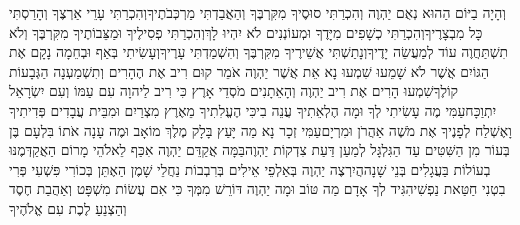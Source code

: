 \documentclass[../main/main.tex]{subfiles}
\begin{document}
\begin{multicols*}{\ncols}
וְהָיָה בַיּוֹם הַהוּא נְאֻם יַהְוֶה וְהִכְרַתִּי סוּסֶיךָ מִקִּרְבֶּךָ וְהַאֲבַדְתִּי מַרְכְּבֹתֶיךָ\PreVerseSpace{}וְהִכְרַתִּי עָרֵי אַרְצֶךָ וְהָרַסְתִּי כָּל מִבְצָרֶיךָ\PreVerseSpace{}וְהִכְרַתִּי כְשָׁפִים מִיָּדֶךָ וּמְעוֹנְנִים לֹא יִהְיוּ לָךְ\PreVerseSpace{}וְהִכְרַתִּי פְסִילֶיךָ וּמַצֵּבוֹתֶיךָ מִקִּרְבֶּךָ וְלֹא תִשְׁתַּחֲוֶה עוֹד לְמַעֲשֵׂה יָדֶיךָ\PreVerseSpace{}וְנָתַשְׁתִּי אֲשֵׁירֶיךָ מִקִּרְבֶּךָ וְהִשְׁמַדְתִּי עָרֶיךָ\PreVerseSpace{}וְעָשִׂיתִי בְּאַף וּבְחֵמָה נָקָם אֶת הַגּוֹיִם אֲשֶׁר לֹא שָׁמֵעוּ \ClosedSection{}שִׁמְעוּ נָא אֵת אֲשֶׁר יַהְוֶה אֹמֵר קוּם רִיב אֶת הֶהָרִים וְתִשְׁמַעְנָה הַגְּבָעוֹת קוֹלֶךָ\PreVerseSpace{}שִׁמְעוּ הָרִים אֶת רִיב יַהְוֶה וְהָאֵתָנִים מֹסְדֵי אָרֶץ כִּי רִיב לַיהוָה עִם עַמּוֹ וְעִם יִשְׂרָאֵל יִתְוַכָּח\PreVerseSpace{}עַמִּי מֶה עָשִׂיתִי לְךָ וּמָה הֶלְאֵתִיךָ עֲנֵה בִי\PreVerseSpace{}כִּי הֶעֱלִתִיךָ מֵאֶרֶץ מִצְרַיִם וּמִבֵּית עֲבָדִים פְּדִיתִיךָ וָאֶשְׁלַח לְפָנֶיךָ אֶת מֹשֶׁה אַהֲרֹן וּמִרְיָם\PreVerseSpace{}עַמִּי זְכָר נָא מַה יָּעַץ בָּלָק מֶלֶךְ מוֹאָב וּמֶה עָנָה אֹתוֹ בִּלְעָם בֶּן בְּעוֹר מִן הַשִּׁטִּים עַד הַגִּלְגָּל לְמַעַן דַּעַת צִדְקוֹת יַהְוֶה\PreVerseSpace{}בַּמָּה אֲקַדֵּם יַהְוֶה אִכַּף לֵאלֹהֵי מָרוֹם הַאֲקַדְּמֶנּוּ בְעוֹלוֹת בַּעֲגָלִים בְּנֵי שָׁנָה\PreVerseSpace{}הֲיִרְצֶה יַהְוֶה בְּאַלְפֵי אֵילִים בְּרִבְבוֹת נַחֲלֵי שָׁמֶן הַאֶתֵּן בְּכוֹרִי פִּשְׁעִי פְּרִי בִטְנִי חַטַּאת נַפְשִׁי\PreVerseSpace{}הִגִּיד לְךָ אָדָם מַה טּוֹב וּמָה יַהְוֶה דּוֹרֵשׁ מִמְּךָ כִּי אִם עֲשׂוֹת מִשְׁפָּט וְאַהֲבַת חֶסֶד וְהַצְנֵעַ לֶכֶת עִם אֱלֹהֶיךָ\OpenSection{}\par

\end{multicols*}
\end{document}
